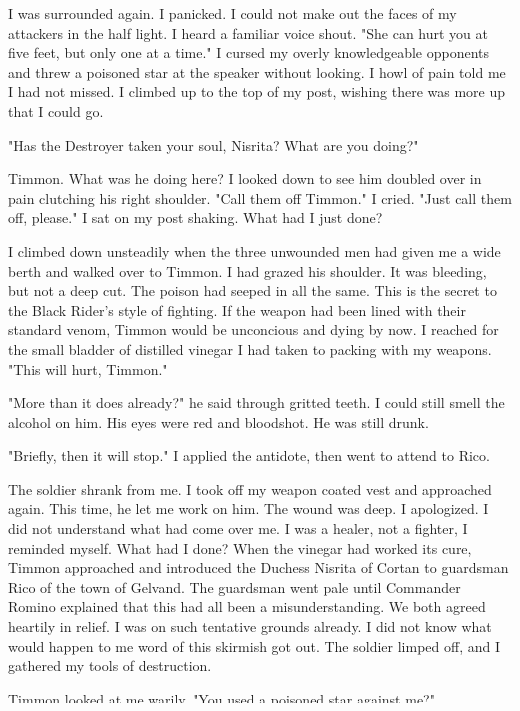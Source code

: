 \documentclass{article}
\begin{document}
I was surrounded again. I panicked. I could not make out the faces of my attackers in the half light. I heard a familiar voice shout. "She can hurt you at five feet, but only one at a time." I cursed my overly knowledgeable opponents and threw a poisoned star at the speaker without looking. I howl of pain told me I had not missed. I climbed up to the top of my post, wishing there was more up that I could go. 

"Has the Destroyer taken your soul, Nisrita? What are you doing?"

Timmon. What was he doing here? I looked down to see him doubled over in pain clutching his right shoulder. "Call them off Timmon." I cried. "Just call them off, please." I sat on my post shaking. What had I just done?

I climbed down unsteadily when the three unwounded men had given me a wide berth and walked over to Timmon. I had grazed his shoulder. It was bleeding, but not a deep cut. The poison had seeped in all the same. This is the secret to the Black Rider's style of fighting. If the weapon had been lined with their standard venom, Timmon would be unconcious and dying by now. I reached for the small bladder of distilled vinegar I had taken to packing with my weapons. "This will hurt, Timmon."

"More than it does already?" he said through gritted teeth. I could still smell the alcohol on him. His eyes were red and bloodshot. He was still drunk.

"Briefly, then it will stop." I applied the antidote, then went to attend to Rico.

The soldier shrank from me. I took off my weapon coated vest and approached again. This time, he let me work on him. The wound was deep. I apologized. I did not understand what had come over me. I was a healer, not a fighter, I reminded myself. What had I done? When the vinegar had worked its cure, Timmon approached and introduced the Duchess Nisrita of Cortan to guardsman Rico of the town of Gelvand. The guardsman went pale until Commander Romino explained that this had all been a misunderstanding. We both agreed heartily in relief. I was on such tentative grounds already. I did not know what would happen to me word of this skirmish got out. The soldier limped off, and I gathered my tools of destruction. 

Timmon looked at me warily. "You used a poisoned star against me?"

"Not a lethal one, Timmon." I said undoing the straps strung between the poles. I could not bring myself to face him. "I do not use lethal poisons any more. I am a healer not a fighter."
\end{document}
